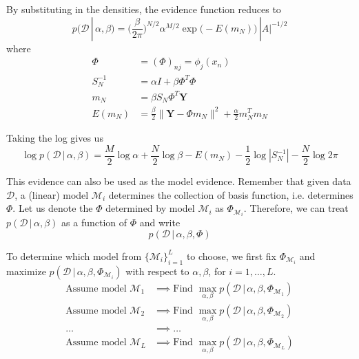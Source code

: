   By substituting in the densities, the evidence function reduces to
  \begin{equation}
    p(\mathcal{D}\,|\,\alpha, \beta) = \bigg(\frac{\beta}{2 \pi}\bigg)^{N/2} \alpha^{M/2} \exp\big( -E (m_N)\big) \,|A|^{-1/2}
  \end{equation}
  where
  \begin{align*}
    \Phi & = (\Phi)_{nj} = \phi_j (x_n) \\
    S_N^{-1} & = \alpha I + \beta \Phi^T \Phi \\
    m_N & = \beta S_N \Phi^T \mathbf{Y} \\
    E(m_N) & = \frac{\beta}{2} \|\mathbf{Y} - \Phi m_N\|^2 + \frac{\alpha}{2} m_N^T m_N
  \end{align*}

  Taking the log gives us
  \begin{equation}
    \log{p(\mathcal{D}\,|\,\alpha, \beta)} = \frac{M}{2}\log{\alpha} + \frac{N}{2} \log{\beta} - E(m_N) - \frac{1}{2} \log{|S_N^{-1}|} - \frac{N}{2} \log{2 \pi}
  \end{equation}

  This evidence can also be used as the model evidence. Remember that given data $\mathcal{D}$, a (linear) model $\mathcal{M}_i$ determines the collection of basis function, i.e. determines $\Phi$. Let us denote the $\Phi$ determined by model $\mathcal{M}_i$ as $\Phi_{\mathcal{M}_i}$. Therefore, we can treat $p(\mathcal{D}\,|\,\alpha, \beta)$ as a function of $\Phi$ and write
  \begin{equation}
    p(\mathcal{D}\,|\,\alpha, \beta, \Phi)
  \end{equation}

  To determine which model from $\{\mathcal{M}_i\}_{i=1}^L$ to choose, we first fix $\Phi_{\mathcal{M}_i}$ and maximize $p(\mathcal{D}\,|\,\alpha, \beta, \Phi_{\mathcal{M}_i})$ with respect to $\alpha, \beta$, for $i = 1, \ldots, L$.
  \begin{align*}
    \text{Assume model } \mathcal{M}_1 & \implies \text{Find } \max_{\alpha, \beta} p(\mathcal{D}\,|\,\alpha, \beta, \Phi_{\mathcal{M}_1}) \\
    \text{Assume model } \mathcal{M}_2 & \implies \text{Find } \max_{\alpha, \beta} p(\mathcal{D}\,|\,\alpha, \beta, \Phi_{\mathcal{M}_2}) \\
    \ldots & \implies \ldots \\
    \text{Assume model } \mathcal{M}_L & \implies \text{Find } \max_{\alpha, \beta} p(\mathcal{D}\,|\,\alpha, \beta, \Phi_{\mathcal{M}_L})
  \end{align*}


